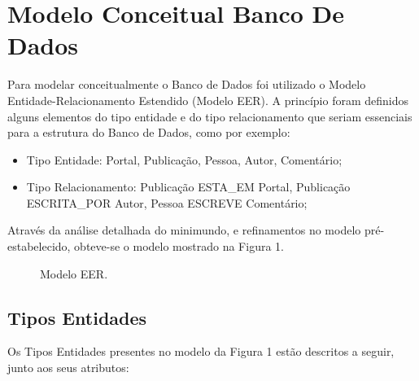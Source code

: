 \section{Modelo Conceitual Banco De Dados}

Para modelar conceitualmente o Banco de Dados foi utilizado o Modelo Entidade-Relacionamento Estendido (Modelo EER). A princípio foram definidos alguns elementos do tipo entidade e do tipo relacionamento que seriam essenciais para a estrutura do Banco de Dados, como por exemplo:

\begin{itemize}
				\item Tipo Entidade: Portal, Publicação, Pessoa, Autor, Comentário; 

				\item  Tipo Relacionamento: Publicação ESTA\_EM Portal, Publicação ESCRITA\_POR Autor, Pessoa ESCREVE Comentário;
\end{itemize}

Através da análise detalhada do minimundo, e refinamentos no modelo pré-estabelecido, obteve-se o modelo mostrado na Figura 1.

\begin{figure}[H]
				\centering

\caption{Modelo EER.}
\end{figure}
\subsection{Tipos Entidades}

Os Tipos Entidades presentes no modelo da Figura 1 estão descritos a seguir, junto aos seus atributos:

